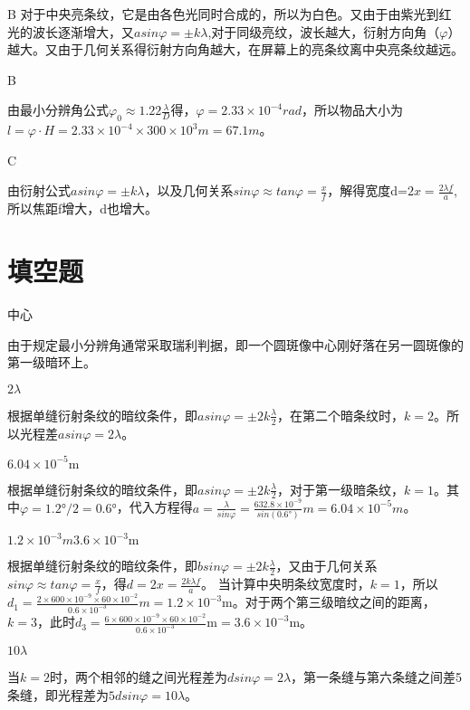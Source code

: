 \exercise

\solve B
对于中央亮条纹，它是由各色光同时合成的，所以为白色。又由于由紫光到红光的波长逐渐增大，又$asin\varphi=\pm k\lambda$,对于同级亮纹，波长越大，衍射方向角（$\varphi$）越大。又由于几何关系得衍射方向角越大，在屏幕上的亮条纹离中央亮条纹越远。

\exercise B

\solve
由最小分辨角公式$\varphi_0\approx1.22\frac{\lambda}{D}$得，$\varphi=2.33\times10^{-4}rad$，所以物品大小为$l=\varphi\cdot H=2.33\times10^{-4}\times300\times10^{3}m=67.1m$。

\exercise C

\solve
由衍射公式$asin\varphi=\pm k\lambda$，以及几何关系$sin\varphi\approx tan\varphi=\frac{x}{f}$，解得宽度d=$2x=\frac{2\lambda f}{a}$,所以焦距f增大，d也增大。

\section{填空题}
\exercise 中心

\solve
由于规定最小分辨角通常采取瑞利判据，即一个圆斑像中心刚好落在另一圆斑像的第一级暗环上。

\exercise $2\lambda$

\solve
根据单缝衍射条纹的暗纹条件，即$asin\varphi=\pm2k\frac{\lambda}{2}$，在第二个暗条纹时，$k=2$。所以光程差$asin\varphi=2\lambda$。

\exercise $6.04\times10^{-5}\mathrm{m}$

\solve
根据单缝衍射条纹的暗纹条件，即$asin\varphi=\pm2k\frac{\lambda}{2}$，对于第一级暗条纹，$k=1$。其中$\varphi=1.2°/2=0.6°$，代入方程得$a=\frac{\lambda}{sin\varphi}=\frac{632.8\times10^{-9}}{sin(0.6°)}m=6.04\times10^{-5}m$。

\exercise $1.2\times10^{-3}m$\quad $3.6\times10^{-3}\mathrm{m}$

\solve
根据单缝衍射条纹的暗纹条件，即$bsin\varphi=\pm2k\frac{\lambda}{2}$，又由于几何关系$sin\varphi\approx tan\varphi=\frac{x}{f}$，得$d=2x=\frac{2k\lambda f}{a}$。 当计算中央明条纹宽度时，$k=1$，所以$d_1=\frac{2\times600\times10^{-9}\times60\times10^{-2}}{0.6\times10^{-3}}m=1.2\times10^{-3}\mathrm{m}$。对于两个第三级暗纹之间的距离，$k=3$，此时$d_3=\frac{6\times600\times10^{-9}\times60\times10^{-2}}{0.6\times10^{-3}}\mathrm{m}=3.6\times10^{-3}\mathrm{m}$。

\exercise $10\lambda$

\solve
当$k=2$时，两个相邻的缝之间光程差为$dsin\varphi=2\lambda$，第一条缝与第六条缝之间差5条缝，即光程差为$5dsin\varphi=10\lambda$。

